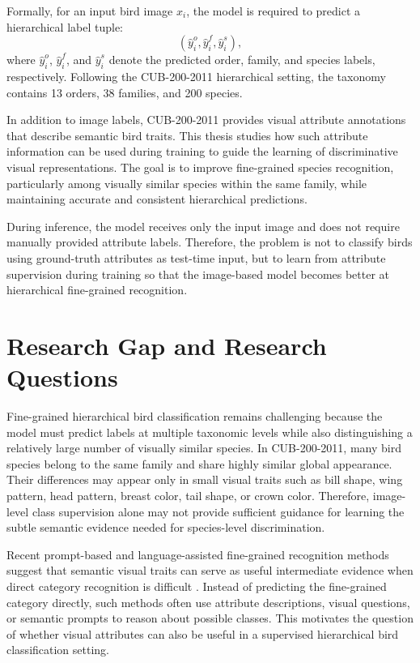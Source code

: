 Formally, for an input bird image \(x_i\), the model is required to predict a hierarchical label tuple:
\[
    (\hat{y}_i^{o}, \hat{y}_i^{f}, \hat{y}_i^{s}),
\]
where \(\hat{y}_i^{o}\), \(\hat{y}_i^{f}\), and \(\hat{y}_i^{s}\) denote the predicted order, family, and species labels, respectively. Following the CUB-200-2011 hierarchical setting, the taxonomy contains 13 orders, 38 families, and 200 species.

In addition to image labels, CUB-200-2011 provides visual attribute annotations that describe semantic bird traits. This thesis studies how such attribute information can be used during training to guide the learning of discriminative visual representations. The goal is to improve fine-grained species recognition, particularly among visually similar species within the same family, while maintaining accurate and consistent hierarchical predictions.

During inference, the model receives only the input image and does not require manually provided attribute labels. Therefore, the problem is not to classify birds using ground-truth attributes as test-time input, but to learn from attribute supervision during training so that the image-based model becomes better at hierarchical fine-grained recognition.


\section{Research Gap and Research Questions}

Fine-grained hierarchical bird classification remains challenging because the model must predict labels at multiple taxonomic levels while also distinguishing a relatively large number of visually similar species. In CUB-200-2011, many bird species belong to the same family and share highly similar global appearance. Their differences may appear only in small visual traits such as bill shape, wing pattern, head pattern, breast color, tail shape, or crown color. Therefore, image-level class supervision alone may not provide sufficient guidance for learning the subtle semantic evidence needed for species-level discrimination.

Recent prompt-based and language-assisted fine-grained recognition methods suggest that semantic visual traits can serve as useful intermediate evidence when direct category recognition is difficult \cite{liu2024democratizing}. Instead of predicting the fine-grained category directly, such methods often use attribute descriptions, visual questions, or semantic prompts to reason about possible classes. This motivates the question of whether visual attributes can also be useful in a supervised hierarchical bird classification setting.

